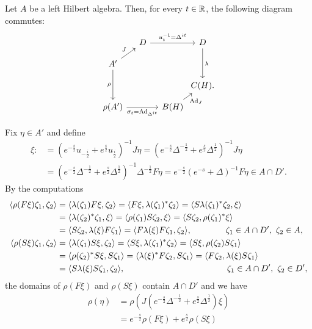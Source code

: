 \documentclass{../../small}
\begin{document}
\begin{thm}
Let $A$ be a left Hilbert algebra.
Then, for every $t\in\mathbb{R}$, the following diagram commutes:
\[\begin{tikzcd}[column sep={3.5em,between origins},row sep={2.5em,between origins}]
&D\ar{rr}{u_t^{-1}=\Delta^{it}}&&D\ar{dd}{\lambda}\\
A'\ar{ur}{J}\ar[swap]{dd}{\rho}&&&\\
&&&C(H).\\
\rho(A')\ar[swap]{rr}{\sigma_t=\Ad_{\Delta^{it}}}&&B(H)\ar[swap]{ur}{\Ad_J}&
\end{tikzcd}\]
\end{thm}
\begin{pf}
Fix $\eta\in A'$ and define
\begin{align*}
\xi:&=(e^{-\frac s2}u_{-\frac i2}+e^{\frac s2}u_{\frac i2})^{-1}J\eta
=(e^{-\frac s2}\Delta^{-\frac12}+e^{\frac s2}\Delta^{\frac12})^{-1}J\eta\\
&=(e^{-\frac s2}\Delta^{-\frac12}+e^{\frac s2}\Delta^{\frac12})^{-1}\Delta^{-\frac12}F\eta
=e^{-\frac s2}(e^{-s}+\Delta)^{-1}F\eta
\in A\cap D'.
\end{align*}
By the computations
\begin{align*}
\langle\rho(F\xi)\zeta_1,\zeta_2\rangle
&=\langle\lambda(\zeta_1)F\xi,\zeta_2\rangle
=\langle F\xi,\lambda(\zeta_1)^*\zeta_2\rangle
=\langle S\lambda(\zeta_1)^*\zeta_2,\xi\rangle\\
&=\langle\lambda(\zeta_2)^*\zeta_1,\xi\rangle
=\langle\rho(\zeta_1)S\zeta_2,\xi\rangle
=\langle S\zeta_2,\rho(\zeta_1)^*\xi\rangle\\
&=\langle S\zeta_2,\lambda(\xi)F\zeta_1\rangle
=\langle F\lambda(\xi)F\zeta_1,\zeta_2\rangle,\qquad\qquad\zeta_1\in A\cap D',\ \zeta_2\in A,\\
\langle\rho(S\xi)\zeta_1,\zeta_2\rangle
&=\langle\lambda(\zeta_1)S\xi,\zeta_2\rangle
=\langle S\xi,\lambda(\zeta_1)^*\zeta_2\rangle
=\langle S\xi,\rho(\zeta_2)S\zeta_1\rangle\\
&=\langle\rho(\zeta_2)^*S\xi,S\zeta_1\rangle
=\langle\lambda(\xi)^*F\zeta_2,S\zeta_1\rangle
=\langle F\zeta_2,\lambda(\xi)S\zeta_1\rangle\\
&=\langle S\lambda(\xi)S\zeta_1,\zeta_2\rangle,\qquad\qquad\qquad\qquad\qquad\qquad\zeta_1\in A\cap D',\ \zeta_2\in D',
\end{align*}
the domains of $\rho(F\xi)$ and $\rho(S\xi)$ contain $A\cap D'$ and we have
\begin{align*}
\rho(\eta)
&=\rho(J(e^{-\frac s2}\Delta^{-\frac12}+e^{\frac s2}\Delta^{\frac12})\xi)\\
&=e^{-\frac s2}\rho(F\xi)+e^{\frac s2}\rho(S\xi)\\

\end{align*}
\end{pf}
\end{document}
